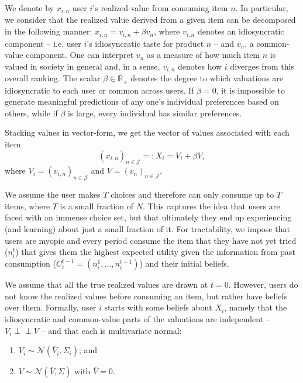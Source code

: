 \documentclass[manuscript]{acmart}
\newcommand{\xhdr}[1]{\vspace{1mm} \noindent{\bf #1}}
\begin{document}
We denote by $x_{i,n}$ user $i$'s realized value from consuming item $n$. In particular, we consider that the realized value derived from a given item can be decomposed in the following manner: $x_{i,n}= v_{i,n} + \beta v_n$, where $v_{i,n}$ denotes an idiosyncratic component -- i.e. user $i$'s idiosyncratic taste for product $n$ --  and $v_{n}$, a common-value component. One can interpret $v_n$ as a measure of how much item $n$ is valued in society in general and, in a sense, $v_{i,n}$ denotes how $i$ diverges from this overall ranking. The scalar $\beta \in \mathbb{R}_{+}$ denotes the degree to which valuations are idiosyncratic to each user or common across users. If $\beta=0$, it is impossible to generate meaningful predictions of any one's individual preferences based on others, while if $\beta$ is large, every individual has similar preferences.
\par
Stacking values in vector-form, we get the vector of values associated with each item 
$${\left(x_{i,n}\right)}_{n \in \mathcal{J}}=:X_i =V_i+ \beta V, $$
where $V_i ={\left(v_{i,n}\right)}_{n \in \mathcal{J}}$ and $V={\left(v_{n}\right)}_{n \in \mathcal{J}}$.
\par
\xhdr{User Decision-Making.}
We assume the user makes $T$ choices and therefore can only consume up to $T$ items, where $T$ is a small fraction of $N$. This captures the idea that users are faced with an immense choice set, but that ultimately they end up experiencing (and learning) about just a small fraction of it. For tractability, we impose that users are myopic and every period consume the item that they have not yet tried ($n_i^t$) that gives them the highest expected utility given the information from past consumption ($C_i^{t-1}=(n_i^1,...,n_i^{t-1})$) and their initial beliefs.
\par
\xhdr{User Beliefs.} We assume that all the true realized values are drawn at $t = 0$. However, users do not know the realized values before consuming an item, but rather have beliefs over them.
Formally, user $i$ starts with some beliefs about $X_i$, namely that the idiosyncratic and common-value parts of the valuations are independent -- $V_i \perp \!\!\! \perp V$ -- and that each is multivariate normal: 
\begin{enumerate}[topsep=0pt]
\item $V_i \sim \mathcal N (\overline V_i, \Sigma_i)$; and 
\item $V \sim \mathcal N(\overline V, \Sigma)$ with $\overline V =0$.
\end{enumerate}
\end{document}

